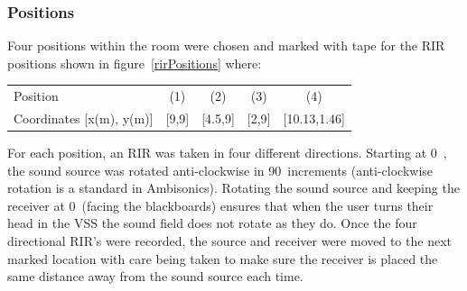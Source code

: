 \documentclass[../../main.tex]{subfiles}
\begin{document}
	\subsubsection{Positions}

		Four positions within the room were chosen and marked with tape for the \ac{RIR} positions shown in figure~\ref{rirPositions} where:

		\begin{center}
			\begin{tabular}{l| c c c c}
				Position & (1) & (2) & (3) & (4) \\
			Coordinates [x(m), y(m)] & [9,9] & [4.5,9] & [2,9] &  [10.13,1.46]\\
			\end{tabular}
		\end{center}

		\vspace{5mm}


		For each position, an \ac{RIR} was taken in four different directions. Starting at 0\textdegree~, the sound source was rotated anti-clockwise in 90\textdegree~increments (anti-clockwise rotation is a standard in Ambisonics). Rotating the sound source and keeping the receiver at 0\textdegree~(facing the blackboards) ensures that when the user turns their head in the \ac{VSS} the sound field does not rotate as they do. Once the four directional \ac{RIR}'s were recorded, the source and receiver were moved to the next marked location with care being taken to make sure the receiver is placed the same distance away from the sound source each time.
\end{document}
